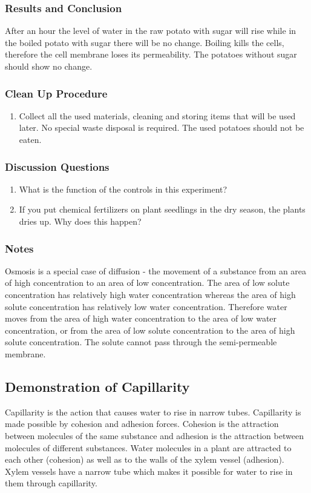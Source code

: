 \subsubsection*{Results and Conclusion}
After an hour the level of water in the raw potato with sugar will rise while in the boiled potato with sugar there will be no change. Boiling kills the cells, therefore the cell membrane loses its permeability. The potatoes without sugar should show no change.

\subsubsection*{Clean Up Procedure}
\begin{enumerate}
\item{Collect all the used materials, cleaning and storing items that will be used later. No special waste disposal is required. The used potatoes should not be eaten.}
\end{enumerate}

\subsubsection*{Discussion Questions}
\begin{enumerate}
\item{What is the function of the controls in this experiment?}
\item{If you put chemical fertilizers on plant seedlings in the dry season, the plants dries up. Why does this happen?}
\end{enumerate}

\subsubsection*{Notes}
Osmosis is a special case of diffusion - the movement of a substance from an area of high concentration to an area of low concentration. The area of low solute concentration has relatively high water concentration whereas the area of high solute concentration has relatively low water concentration. Therefore water moves from the area of high water concentration to the area of low water concentration, or from the area of low solute concentration to the area of high solute concentration. The solute cannot pass through the semi-permeable membrane.

\subsection{Demonstration of Capillarity}
Capillarity is the action that causes water to rise in narrow tubes. Capillarity is made possible by cohesion and adhesion forces. Cohesion is the attraction between molecules of the same substance and adhesion is the attraction between  molecules of different substances. Water molecules in a plant are attracted to each other (cohesion) as well as to the walls of the xylem vessel (adhesion). Xylem vessels have a narrow tube which makes it possible for water to rise in them through capillarity.

